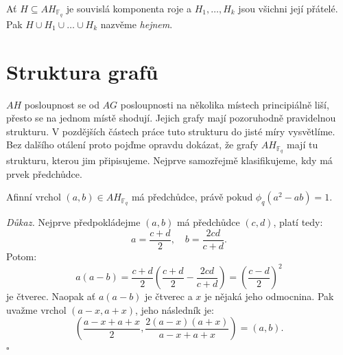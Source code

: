 \documentclass[12pt]{report}
\begin{document}
\begin{definice}
Ať $H \subseteq AH_{\mathbb{F}_q}$ je souvislá komponenta roje a $H_1,\dots,H_k$ jsou všichni její přátelé. Pak $H \cup H_1 \cup \dots \cup H_k$ nazvěme \textit{hejnem}.
\end{definice}
 

\section{Struktura grafů}

$AH$ posloupnost se od $AG$ posloupnosti na několika místech principiálně liší, přesto se na jednom místě shodují. Jejich grafy mají pozoruhodně pravidelnou strukturu. V pozdějších částech práce tuto strukturu do jisté míry vysvětlíme. Bez dalšího otálení proto pojďme opravdu dokázat, že grafy $AH_{\mathbb{F}_q}$ mají tu strukturu, kterou jim připisujeme. Nejprve samozřejmě klasifikujeme, kdy má prvek předchůdce.

\begin{lemma}
Afinní vrchol $(a,b) \in AH_{\mathbb{F}_q}$ má předchůdce, právě pokud $\phi_q(a^2-ab)=1$.
\end{lemma}

\noindent \textit{Důkaz.} Nejprve předpokládejme $(a,b)$ má předchůdce $(c,d)$, platí tedy:
\begin{equation*}
a = \frac{c+d}{2}, \quad b = \frac{2cd}{c+d}.
\end{equation*}
Potom:
\begin{equation*}
a(a-b) = \frac{c+d}{2} \left( \frac{c+d}{2} - \frac{2cd}{c+d} \right) =\left( \frac{c-d}{2}\right)^2
\end{equation*}
je čtverec. Naopak ať $a(a-b)$ je čtverec a $x$ je nějaká jeho odmocnina. Pak uvažme vrchol $(a-x,a+x)$, jeho následník je: $$\left(\frac{a-x+a+x}{2}, \frac{2 (a-x)(a+x)}{a-x+a+x} \right)= \left(a, b \right).$$ \hfill $\square$\\
\end{document}
